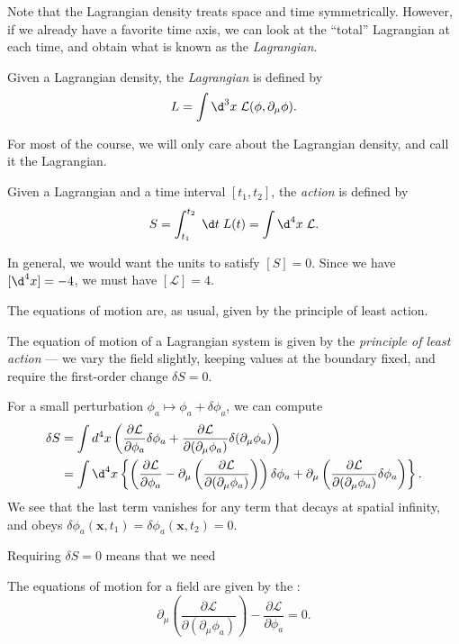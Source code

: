 \documentclass[a4paper]{article}
\begin{document}
Note that the Lagrangian density treats space and time symmetrically. However, if we already have a favorite time axis, we can look at the ``total'' Lagrangian at each time, and obtain what is known as the \emph{Lagrangian}.

\begin{defi}[Lagrangian]
  Given a Lagrangian density, the \emph{Lagrangian} is defined by
  \[
    L = \int \d^3 x\; \mathcal{L}(\phi, \partial_\mu \phi).
  \]
\end{defi}
For most of the course, we will only care about the Lagrangian density, and call it the Lagrangian.

\begin{defi}[Action]
  Given a Lagrangian and a time interval $[t_1, t_2]$, the \emph{action} is defined by
  \[
    S = \int_{t_1}^{t_2} \;\d t\; L(t) = \int \d^4 x\; \mathcal{L}.
  \]
\end{defi}
In general, we would want the units to satisfy $[S] = 0$. Since we have $[\d^4 x] = -4$, we must have $[\mathcal{L}] = 4$.

The equations of motion are, as usual, given by the principle of least action.
\begin{defi}
  The equation of motion of a Lagrangian system is given by the \emph{principle of least action} --- we vary the field slightly, keeping values at the boundary fixed, and require the first-order change $\delta S = 0$.
\end{defi}

For a small perturbation $\phi_a \mapsto \phi_a + \delta \phi_a$, we can compute
\begin{align*}
  \delta S &= \int d^4 x\left(\frac{\partial \mathcal{L}}{\partial \phi_a} \delta \phi_a + \frac{\partial \mathcal{L}}{\partial (\partial_\mu \phi_a)} \delta(\partial_\mu\phi_a)\right)\\
  &= \int \d^4 x \left\{\left(\frac{\partial \mathcal{L}}{\partial \phi_a} - \partial_\mu\left(\frac{\partial \mathcal{L}}{\partial (\partial_\mu\phi_a)}\right)\right) \delta \phi_a + \partial_\mu \left(\frac{\partial \mathcal{L}}{\partial (\partial_\mu\phi_a)} \delta\phi_a\right)\right\}.
\end{align*}
We see that the last term vanishes for any term that decays at spatial infinity, and obeys $\delta \phi_a(\mathbf{x}, t_1) = \delta\phi_a(\mathbf{x}, t_2) = 0$.

Requiring $\delta S = 0$ means that we need
\begin{prop}
  The equations of motion for a field are given by the :
  \[
    \partial_\mu\left(\frac{\partial \mathcal{L}}{\partial (\partial_\mu \phi_a)}\right) - \frac{\partial \mathcal{L}}{\partial \phi_a} = 0.
  \]
\end{prop}
\end{document}
